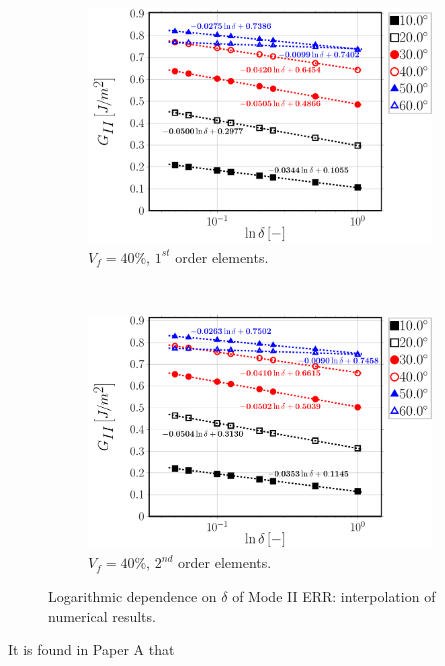 \begin{figure}[!h]
    \begin{subfigure}[b]{0.48\textwidth}
        \includegraphics[width=\textwidth]{paperA/Vf40-free-1st-semilogvsDelta-GII.pdf}
       \caption{$V_{f}=40\%$, $1^{st}$ order elements.}
    \end{subfigure}
    ~
    \begin{subfigure}[b]{0.48\textwidth}
        \includegraphics[width=\textwidth]{paperA/Vf40-free-2nd-semilogvsDelta-GII.pdf}
       \caption{$V_{f}=40\%$, $2^{nd}$ order elements.}
    \end{subfigure}

\caption{Logarithmic dependence on $\delta$ of Mode II ERR: interpolation of numerical results.}\label{chap3:paperA:fig:gIIinterp}
\end{figure}

It is found in Paper A that

